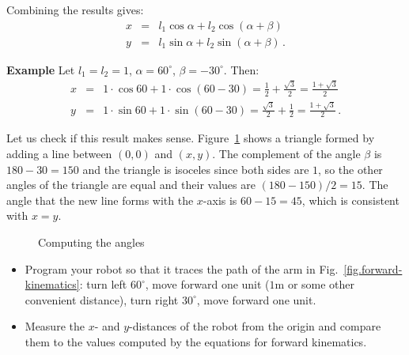 Combining the results gives:
\begin{eqnarray*}
x &=& l_1 \cos \alpha + l_2 \cos(\alpha + \beta)\\
y &=& l_1 \sin \alpha + l_2 \sin(\alpha + \beta)\,.
\end{eqnarray*}

\noindent\textbf{Example} Let $l_1 = l_2 = 1$, $\alpha = 60^{\circ}$, $\beta = -30^{\circ}$. Then:
\begin{eqnarray*}
x &=& 1\cdot\cos 60 + 1\cdot\cos(60-30) = \frac{1}{2} + \frac{\sqrt{3}}{2} = \frac{1+\sqrt{3}}{2}\\
y &=& 1\cdot\sin 60 + 1\cdot\sin(60-30) = \frac{\sqrt{3}}{2} + \frac{1}{2} = \frac{1+\sqrt{3}}{2}\,.
\end{eqnarray*}

Let us check if this result makes sense. Figure~\ref{fig.kinematics-triangle} shows a triangle formed by adding a line between $(0,0)$ and $(x,y)$. The complement of the angle $\beta$ is $180-30=150$ and the triangle is isoceles since both sides are $1$, so the other angles of the triangle are equal and their values are $(180-150)/2=15$. The angle that the new line forms with the $x$-axis is $60-15=45$, which is consistent with $x=y$.

\begin{figure}
\begin{center}
\end{center}
\caption{Computing the angles}\label{fig.kinematics-triangle}
\end{figure}

\begin{framed}
\begin{itemize}
\item Program your robot so that it traces the path of the arm in Fig.~\ref{fig.forward-kinematics}: turn left $60^{\circ}$, move forward one unit ($1$m or some other convenient distance), turn right $30^{\circ}$, move forward one unit.
\item Measure the $x$- and $y$-distances of the robot from the origin and compare them to the values computed by the equations for forward kinematics.
\end{itemize}
\end{framed}

